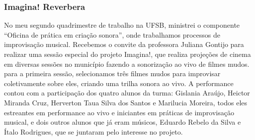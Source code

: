 \subsubsection{Imagina! Reverbera}

No meu segundo quadrimestre de trabalho na UFSB, ministrei o componente ``Oficina de prática em criação sonora'', onde trabalhamos processos de improvisação musical. Recebemos o convite da professora Juliana Gontijo para realizar uma sessão especial do projeto Imagina!, que realiza projeções de cinema em diversas sessões no município fazendo a sonorização ao vivo de filmes mudos. para a primeira sessão, selecionamos três filmes mudos para improvisar coletivamente sobre eles, criando uma trilha sonora ao vivo. A performance contou com a participação dos quatro alunos da turma: Gislania Araújo, Heictor Miranda Cruz, Herverton Taua Silva dos Santos e Marilucia Moreira, todos eles estreantes em performance ao vivo e iniciantes em práticas de improvisação musical, e dois outros alunos que já eram músicos, Eduardo Rebelo da Silva e Ítalo Rodrigues, que se juntaram pelo interesse no projeto.

